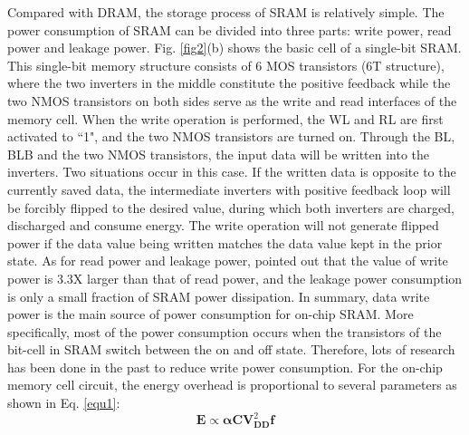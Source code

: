 \documentclass[lettersize,journal]{IEEEtran}
\begin{document}
Compared with DRAM, the storage process of SRAM is relatively simple. The power consumption of SRAM can be divided into three parts: write power, read power and leakage power. Fig. \ref{fig2}(b) \cite{5686921} shows the basic cell of a single-bit SRAM. This single-bit memory structure consists of 6 MOS transistors (6T structure), where the two inverters in the middle constitute the positive feedback while the two NMOS transistors on both sides serve as the write and read interfaces of the memory cell. When the write operation is performed, the WL and RL are first activated to ``1", and the two NMOS transistors are turned on. Through the BL, BLB and the two NMOS transistors, the input data will be written into the inverters. Two situations occur in this case. If the written data is opposite to the currently saved data, the intermediate inverters with positive feedback loop will be forcibly flipped to the desired value, during which both inverters are charged, discharged and consume energy. The write operation will not generate flipped power if the data value being written matches the data value kept in the prior state. As for read power and leakage power, \cite{5686921,4342716} pointed out that the value of write power is 3.3X larger than that of read power, and the leakage power consumption is only a small fraction of SRAM power dissipation. In summary, data write power is the main source of power consumption for on-chip SRAM. More specifically, most of the power consumption occurs when the transistors of the bit-cell in SRAM switch between the on and off state. Therefore, lots of research has been done in the past to reduce write power consumption. For the on-chip memory cell circuit, the energy overhead is proportional to several parameters as shown in Eq. \eqref{equ1}:
\begin{equation}
\label{equ1}
\boldsymbol{E}\propto \boldsymbol{\alpha CV}_{\boldsymbol{DD}}^{2}\boldsymbol{f}
\end{equation}
\end{document}
